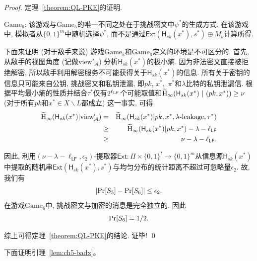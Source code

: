 \begin{proof}{定理~\ref{theorem:QL-PKE}的证明.}
\begin{trivlist}
\item $\text{Game}_6$: 该游戏与$\text{Game}_5$的唯一不同之处在于挑战密文中$\psi^*$的生成方式. 在该游戏中, 模拟者从$\{0, 1\}^m$中随机选择$\psi^*$, 而不是通过$\mathsf{Ext}(\mathsf{H}_{sk}(x^*), s^*)\oplus M_b$计算所得.

下面来证明 (对于敌手来说) 游戏$\text{Game}_5$和$\text{Game}_6$定义的环境是不可区分的. 首先, 从敌手的视图角度 (记做$\text{view}'_{\mathcal{A}}$) 分析$\mathsf{H}_{sk}(x^*)$的极小熵. 因为非法密文直接被拒绝解密, 所以敌手利用解密服务不可能获得关于$\mathsf{H}_{sk}(x^*)$的信息. 所有关于密钥的信息只可能来自公钥, 挑战密文和私钥泄漏, 即$pk$, $x^*,$ $\pi^*$和$\lambda$比特的私钥泄漏信. 根据平均最小熵的性质并结合$\tau^*$仅有$2^{\ell_{\text{LF}}}$个可能取值和$\widetilde{\textup{H}}_{\infty}(\mathsf{H}_{sk}(x^*)~|~(pk, x^*))\geq \nu$ (对于所有$pk$和$x^* \in X\backslash L$都成立) 这一事实, 可得
\begin{eqnarray*}
\widetilde{\textup{H}}_{\infty}(\mathsf{H}_{sk}(x^*) | \text{view}'_{\mathcal{A}}) 
& = & \widetilde{\textup{H}}_{\infty}(\mathsf{H}_{sk}(x^*) | pk, x^*, \lambda\textup{-leakage}, \tau^*) \nonumber\\
&\geq& \widetilde{\textup{H}}_{\infty}(\mathsf{H}_{sk}(x^*) | pk, x^*) - \lambda-\ell_{\mathsf{LF}}\\
&\geq& \nu-\lambda-\ell_{\mathsf{LF}}.
\end{eqnarray*} 

因此, 利用$(\nu-\lambda-\ell_{\mathsf{LF}},\epsilon_2)$-提取器$\mathsf{Ext}:\Pi \times \{0,1\}^t \rightarrow \{0,1\}^m$从信息源$\mathsf{H}_{sk}(x^*)$中提取的随机串$\mathsf{Ext}(\mathsf{H}_{sk}(x^*), s^*)$与均匀分布的统计距离不超过可忽略量$\epsilon_2$. 故, 我们有
\begin{equation*}\label{eq:game6-1}
|\textup{Pr}[S_5]-\textup{Pr}[S_6]| \leq \epsilon_2.
\end{equation*}
在游戏$\text{Game}_6$中, 挑战密文与加密的消息是完全独立的. 因此
\[
\textup{Pr}[S_6]=1/2.
\]
\end{trivlist}

综上可得定理~\ref{theorem:QL-PKE}的结论. 证毕! \qed
\end{proof}

下面证明引理~\ref{lem:ch5-badx}。

